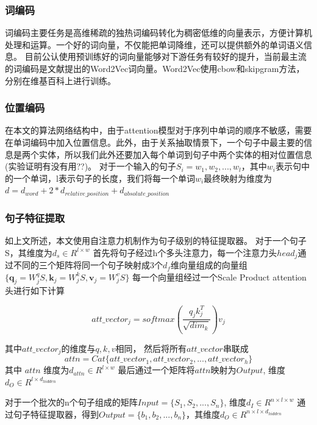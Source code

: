 \documentclass[UTF8]{csoarticle}
\begin{document}
\subsubsection{词编码}
词编码主要任务是高维稀疏的独热词编码转化为稠密低维的向量表示，方便计算机处理和运算。一个好的词向量，不仅能把单词降维，还可以提供额外的单词语义信息。
目前公认使用预训练好的词向量能够对下游任务有较好的提升，当前最主流的词编码是文献\cite{bib9}提出的Word2Vec词向量。Word2Vec使用cbow和skipgram方法，分别在维基百科上进行训练。
\subsubsection{位置编码}
在本文的算法网络结构中，由于attention模型对于序列中单词的顺序不敏感，需要在单词编码中加入位置信息。此外，由于关系抽取情景下，一个句子中最主要的信息是两个实体，所以我们此外还要加入每个单词到句子中两个实体的相对位置信息(实验证明有没有用??)。
对于一个输入的句子$S_i={w_1, w_2, ..., w_l}$，其中$w_i$表示句中的一个单词，l表示句子的长度，我们将每一个单词$w_i$最终映射为维度为$ d=d_{word} + 2*d_{relative\_position} + d_{absolute\_position}$

\subsubsection{句子特征提取}

如上文所述，本文使用自注意力机制作为句子级别的特征提取器。
对于一个句子S，其维度为$d_s\in R^{l\times w}$
首先将句子经过h个多头注意力，每一个注意力头$head_j$通过不同的三个矩阵将同一个句子映射成3个$d_{f}$维向量组成的向量组$\{\boldsymbol q_j=W_j^{q}S, \boldsymbol k_j=W_j^{k}S, \boldsymbol v_j=W_j^{v}S\}$
每一个向量组经过一个Scale Product attention头进行如下计算

\[ att\_vector_{j} = softmax(\frac{q_{j} k_{j}^{T} }{\sqrt{dim_k}})v_{j}\]

其中$att\_vector_j$的维度与$q, k, v$相同，
然后将所有$att\_vector$串联成
\[attn = Cat\{att\_vector_1,att\_vector_2,...,att\_vector_h\}\]
其中 $attn$ 维度为$d_{attn} \in R^{l\times w}$
最后通过一个矩阵将$attn$映射为$Output$, 维度$d_{O} \in R^{l\times d_{hidden}}$

对于一个批次的n个句子组成的矩阵$Input=\{S_1, S_2,...,S_n\}$, 维度$d_{I} \in R^{n\times l\times w}$
通过句子特征提取器，得到$Output=\{b_1, b_2,...,b_n\}$，其维度$d_{O} \in R^{n\times l\times  d_{hidden}}$
\end{document}
